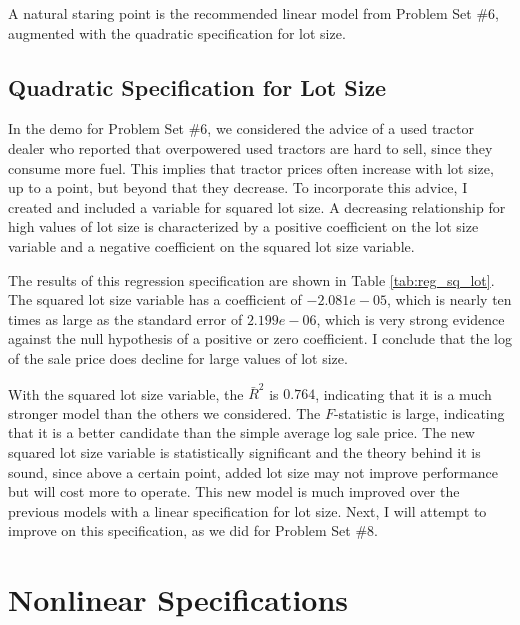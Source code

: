 \documentclass[11pt]{article}
\begin{document}
A natural staring point is the recommended linear model
from Problem Set \#6, augmented with 
the quadratic specification for lot size. 

\subsection{Quadratic Specification for Lot Size}

In the demo for Problem Set \#6, 
we considered the advice of
a used tractor dealer who reported that overpowered used tractors are hard to sell, since they consume more fuel. 
This implies that tractor prices often increase with lot size, up to a point, but beyond that they decrease. 
To incorporate this advice, I created and included a variable for squared lot size. 
A decreasing relationship for high values of lot size
is characterized by 
a positive coefficient on the lot size variable and
a negative coefficient on the squared lot size variable. 

% 

% 
The results of this regression specification are shown in 
Table \ref{tab:reg_sq_lot}. 
%
The squared lot size variable has a coefficient of $-2.081e-05$, which is nearly ten times as large as the standard error of $2.199e-06$, which is very strong evidence against the null hypothesis of a positive or zero coefficient. 
I conclude that the log of the sale price does decline for large values of lot size. 


With the squared lot size variable, the $\bar{R}^2$ is $0.764$, indicating that it is a much stronger model than the others we considered. 
The $F$-statistic is large, indicating that it is a better candidate than the simple average log sale price. 
The new squared lot size variable is statistically significant and the theory behind it is sound, since above a certain point, added lot size may not improve performance but will cost more to operate. 
This new model is much improved over the previous models with a linear specification for lot size.
Next, I will attempt to improve on this specification, 
as we did for Problem Set \#8. 





\section{Nonlinear Specifications}
\end{document}
